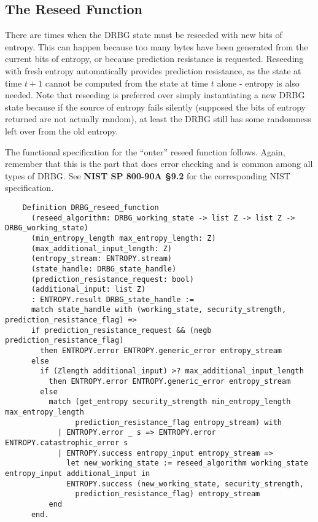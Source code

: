 \documentclass[pageno]{jpaper}
\newcommand{\stdtitle}[1]{\textbf{#1}}
\begin{document}
\subsection{The Reseed Function}
There are times when the DRBG state must be reseeded with new bits of entropy. This can happen because too many bytes have been generated from the current bits of entropy, or because prediction resistance is requested. Reseeding with fresh entropy automatically provides prediction resistance, as the state at time $t + 1$ cannot be computed from the state at time $t$ alone - entropy is also needed. Note that reseeding is preferred over simply instantiating a new DRBG state because if the source of entropy fails silently (supposed the bits of entropy returned are not actually random), at least the DRBG still has some randomness left over from the old entropy.

The functional specification for the “outer” reseed function follows. Again, remember that this is the part that does error checking and is common among all types of DRBG. See \stdtitle{NIST SP 800-90A \S 9.2} for the corresponding NIST specification.

\begin{lstlisting}
    Definition DRBG_reseed_function
      (reseed_algorithm: DRBG_working_state -> list Z -> list Z -> DRBG_working_state)
      (min_entropy_length max_entropy_length: Z)
      (max_additional_input_length: Z)
      (entropy_stream: ENTROPY.stream)
      (state_handle: DRBG_state_handle)
      (prediction_resistance_request: bool)
      (additional_input: list Z)
      : ENTROPY.result DRBG_state_handle :=
      match state_handle with (working_state, security_strength, prediction_resistance_flag) =>
      if prediction_resistance_request && (negb prediction_resistance_flag)
        then ENTROPY.error ENTROPY.generic_error entropy_stream
      else
        if (Zlength additional_input) >? max_additional_input_length
          then ENTROPY.error ENTROPY.generic_error entropy_stream
        else
          match (get_entropy security_strength min_entropy_length max_entropy_length
                prediction_resistance_flag entropy_stream) with
            | ENTROPY.error _ s => ENTROPY.error ENTROPY.catastrophic_error s
            | ENTROPY.success entropy_input entropy_stream =>
              let new_working_state := reseed_algorithm working_state entropy_input additional_input in
              ENTROPY.success (new_working_state, security_strength,
                prediction_resistance_flag) entropy_stream
          end
      end.
\end{lstlisting}
\end{document}
